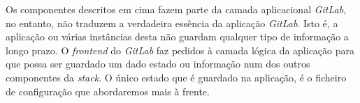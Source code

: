 \documentclass[12pt,a4paper]{article}
\begin{document}
Os componentes descritos em cima fazem parte da camada aplicacional \emph{GitLab}, no entanto, não traduzem a verdadeira essência da aplicação \emph{GitLab}. Isto é, a aplicação ou várias instâncias desta não guardam qualquer tipo de informação a longo prazo. O \emph{frontend} do \emph{GitLab} faz pedidos à camada lógica da aplicação para que possa ser guardado um dado estado ou informação num dos outros componentes da \emph{stack}. O único estado que é guardado na aplicação, é o ficheiro de configuração que abordaremos mais à frente.






\end{document}
